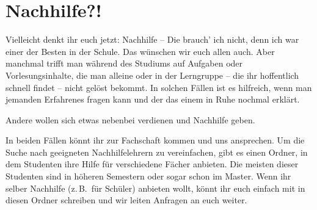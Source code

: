 \section{Nachhilfe?!}
\begin{multicols}{2}
Vielleicht denkt ihr euch jetzt: Nachhilfe -- Die brauch' ich nicht, denn ich war einer der Besten in der Schule. Das wünschen wir euch allen auch. Aber manchmal trifft man während des Studiums auf Aufgaben oder Vorlesungsinhalte, die man alleine oder in der Lerngruppe -- die ihr hoffentlich schnell findet -- nicht gelöst bekommt. In solchen Fällen ist es hilfreich, wenn man jemanden Erfahrenes fragen kann und der das einem in Ruhe nochmal erklärt.

Andere wollen sich etwas nebenbei verdienen und Nachhilfe geben.

In beiden Fällen könnt ihr zur Fachschaft kommen und uns ansprechen. Um die Suche nach geeigneten Nachhilfelehrern zu vereinfachen, gibt es einen Ordner, in dem Studenten ihre Hilfe für verschiedene Fächer anbieten. Die meisten dieser Studenten sind in höheren Semestern oder sogar schon im Master. Wenn ihr selber Nachhilfe (z.\,B.\ für Schüler) anbieten wollt, könnt ihr euch einfach mit in diesen Ordner schreiben und wir leiten Anfragen an euch weiter.

\end{multicols}

